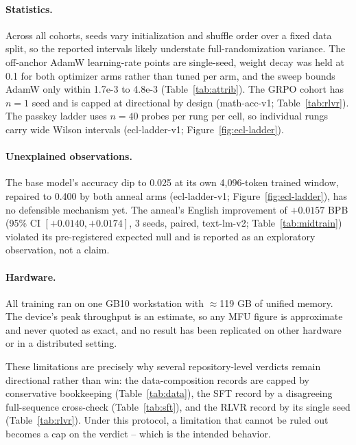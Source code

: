 \paragraph{Statistics.}
Across all cohorts, seeds vary initialization and shuffle order over a fixed data split, so the reported intervals likely understate full-randomization variance. The off-anchor AdamW learning-rate points are single-seed, weight decay was held at 0.1 for both optimizer arms rather than tuned per arm, and the sweep bounds AdamW only within 1.7e-3 to 4.8e-3 (Table~\ref{tab:attrib}). The GRPO cohort has $n{=}1$ seed and is capped at directional by design (math-acc-v1; Table~\ref{tab:rlvr}). The passkey ladder uses $n{=}40$ probes per rung per cell, so individual rungs carry wide Wilson intervals (ecl-ladder-v1; Figure~\ref{fig:ecl-ladder}).

\paragraph{Unexplained observations.}
The base model's accuracy dip to 0.025 at its own 4{,}096-token trained window, repaired to 0.400 by both anneal arms (ecl-ladder-v1; Figure~\ref{fig:ecl-ladder}), has no defensible mechanism yet. The anneal's English improvement of $+0.0157$ BPB (95\% CI $[+0.0140, +0.0174]$, 3 seeds, paired, text-lm-v2; Table~\ref{tab:midtrain}) violated its pre-registered expected null and is reported as an exploratory observation, not a claim.

\paragraph{Hardware.}
All training ran on one GB10 workstation with $\approx$119 GB of unified memory. The device's peak throughput is an estimate, so any MFU figure is approximate and never quoted as exact, and no result has been replicated on other hardware or in a distributed setting.

These limitations are precisely why several repository-level verdicts remain directional rather than win: the data-composition records are capped by conservative bookkeeping (Table~\ref{tab:data}), the SFT record by a disagreeing full-sequence cross-check (Table~\ref{tab:sft}), and the RLVR record by its single seed (Table~\ref{tab:rlvr}). Under this protocol, a limitation that cannot be ruled out becomes a cap on the verdict -- which is the intended behavior.
